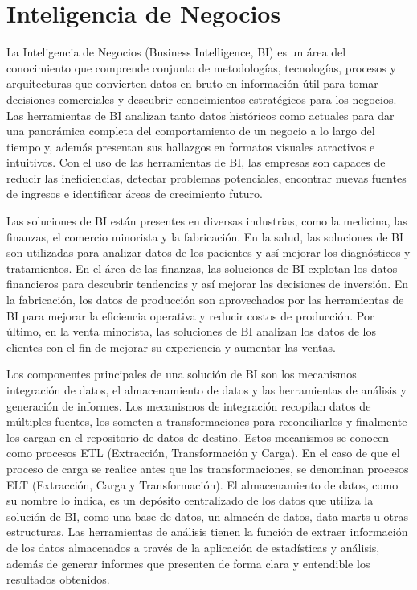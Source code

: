 \section{Inteligencia de Negocios}\label{section:bi}

La Inteligencia de Negocios (Business Intelligence, BI) es un \'area del conocimiento que comprende conjunto de metodologías, 
tecnologías, procesos y arquitecturas que convierten datos 
en bruto en información útil para tomar decisiones comerciales y descubrir conocimientos estratégicos para los negocios. 
Las herramientas de BI analizan tanto datos históricos como actuales para dar una panor\'amica completa del comportamiento 
de un negocio a lo largo del tiempo y, adem\'as presentan sus hallazgos en formatos visuales atractivos e intuitivos. 
Con el uso de las herramientas de BI, las empresas son capaces de reducir las ineficiencias, detectar problemas potenciales, 
encontrar nuevas fuentes de ingresos e identificar áreas de crecimiento futuro.

Las soluciones de BI est\'an presentes en diversas industrias, como la medicina, las finanzas, el comercio minorista y la 
fabricación. En la salud, las soluciones de BI son utilizadas para analizar datos de los pacientes y as\'i mejorar los
diagn\'osticos y tratamientos. En el \'area de las finanzas, las soluciones de BI explotan los datos financieros para 
descubrir tendencias y as\'i mejorar las decisiones de inversi\'on. En la fabricación, los datos de producción son aprovechados 
por las herramientas de BI para mejorar la eficiencia operativa y reducir costos de producción. Por \'ultimo, en la 
venta minorista, las soluciones de BI analizan los datos de los clientes con el fin de mejorar su experiencia y 
aumentar las ventas.

Los componentes principales de una solución de BI son los mecanismos integración de datos, el almacenamiento de datos y 
las herramientas de análisis y generaci\'on de informes\cite{lloyd2011identifying}. Los mecanismos de integración recopilan datos de múltiples fuentes, 
los someten a transformaciones para reconciliarlos y finalmente los cargan en el repositorio de datos de destino. Estos mecanismos se 
conocen como procesos ETL (Extracción, Transformación y Carga). En el caso de que el proceso de carga se realice antes que las transformaciones, 
se denominan procesos ELT (Extracción, Carga y Transformación). 
El almacenamiento de datos, como su nombre lo indica, es un depósito centralizado de los datos que utiliza la solución
de BI, como una base de datos, un almac\'en de datos, data marts u otras estructuras. Las herramientas de análisis tienen la función de extraer 
información de los datos almacenados a través de la aplicación de estadísticas y análisis, adem\'as de generar 
informes que presenten de forma clara y entendible los resultados obtenidos.
